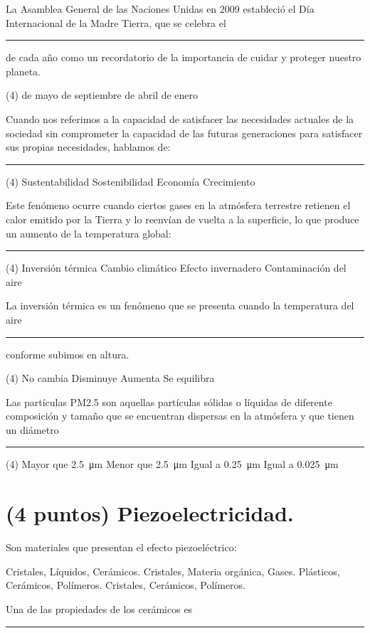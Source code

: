 \documentclass[12pt, letter]{exam}
\begin{document}
\begin{questions}
    \question La Asamblea General de las Naciones Unidas en 2009 estableció el Día Internacional de la Madre Tierra, que se celebra el \rule{2cm}{0.1mm} de cada año como un recordatorio de la importancia de cuidar y proteger nuestro planeta.
    \begin{tasks}(4)
         de mayo
         de septiembre
         de abril
         de enero
    \end{tasks}
    \question Cuando nos referimos a la capacidad de satisfacer las necesidades actuales de la sociedad sin comprometer la capacidad de las futuras generaciones para satisfacer sus propias necesidades, hablamos de: \rule{2cm}{0.1mm}
    \begin{tasks}(4)
        \task Sustentabilidad
        \task Sostenibilidad
        \task Economía
        \task Crecimiento
    \end{tasks}
    \question Este fenómeno ocurre cuando ciertos gases en la atmósfera terrestre retienen el calor emitido por la Tierra y lo reenvían de vuelta a la superficie, lo que produce un aumento de la temperatura global: \rule{2cm}{0.1mm}
    \begin{tasks}(4)
        \task Inversión térmica
        \task Cambio climático
        \task Efecto invernadero
        \task Contaminación del aire
    \end{tasks}
    \question La inversión térmica es un fenómeno que se presenta cuando la temperatura del aire \rule{2cm}{0.1mm} conforme subimos en altura.
    \begin{tasks}(4)
        \task No cambia
        \task Disminuye
        \task Aumenta
        \task Se equilibra
    \end{tasks}
    \question Las partículas PM2.5 son aquellas partículas sólidas o líquidas de diferente composición y tamaño que se encuentran dispersas en la atmósfera y que tienen un diámetro \rule{2cm}{0.1mm}
    \begin{tasks}(4)
        \task Mayor que \SI{2.5}{\micro\meter}
        \task Menor que \SI{2.5}{\micro\meter}
        \task Igual a \SI{0.25}{\micro\meter}
        \task Igual a \SI{0.025}{\micro\meter}
    \end{tasks}

    \section{(4 puntos) Piezoelectricidad.}

    \question Son materiales que presentan el efecto piezoeléctrico:
    \begin{multicols}{2}
    \begin{tasks}
        \task Cristales, Líquidos, Cerámicos.
        \task Cristales, Materia orgánica, Gases.
        \task Plásticos, Cerámicos, Polímeros.
        \task Cristales, Cerámicos, Polímeros.
    \end{tasks}
\end{multicols}
    \question Una de las propiedades de los cerámicos es \rule{2cm}{0.1mm}


\end{questions}
\end{document}
